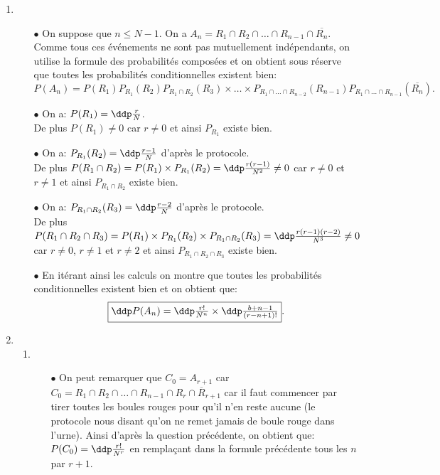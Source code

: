 \begin{correction}   \;
\begin{enumerate}
\item 
\begin{itemize}
\item[$\bullet$] On suppose que $n\leq N-1$. On a $A_n=R_1\cap R_2\cap \dots \cap R_{n-1}\cap \overline{R_n}$. Comme tous ces \'ev\'enements ne sont pas mutuellement ind\'ependants, on utilise la formule des probabilit\'es compos\'ees et on obtient sous r\'eserve que toutes les probabilit\'es conditionnelles existent bien:
$$P(A_n)=P(R_1)P_{R_1}(R_2)P_{R_1\cap R_2}(R_3)\times \dots \times P_{ R_1\cap \dots \cap R_{n-2}}(R_{n-1})P_{R_1\cap \dots \cap R_{n-1}}(\overline{R_n}).$$
\item[$\bullet$] On a: $P(R_1)=\ddp\frac{r}{N}$.\\
\noindent De plus $P(R_1)\not= 0$ car $r\not= 0$ et ainsi $P_{R_1}$ existe bien. 
\item[$\bullet$] On a: $P_{R_1}(R_2)=\ddp\frac{r-1}{N}$ d'apr\`{e}s le protocole.\\
\noindent De plus $P(R_1\cap R_2)=P(R_1)\times P_{R_1}(R_2)=\ddp\frac{r(r-1)}{N^2}\not= 0$ car $r\not= 0$ et $r\not= 1$ et ainsi $P_{R_1\cap R_2}$ existe bien.
\item[$\bullet$] On a: $P_{R_1\cap R_2}(R_3)=\ddp\frac{r-2}{N}$ d'apr\`{e}s le protocole.\\
\noindent De plus $P(R_1\cap R_2\cap R_3)=P(R_1)\times P_{R_1}(R_2)\times P_{R_1\cap R_2}(R_3)=\ddp\frac{r(r-1)(r-2)}{N^3}\not= 0$ car $r\not= 0$, $r\not= 1$ et $r\not= 2$ et ainsi $P_{R_1\cap R_2\cap R_3}$ existe bien. 
\item[$\bullet$]  En it\'erant ainsi les calculs on montre que toutes les probabilit\'es conditionnelles existent bien et on obtient que: $$\fbox{$\ddp P(A_n)=\ddp\frac{r!}{N^n}\times\ddp\frac{b+n-1}{(r-n+1)!}$}.$$
\end{itemize}
\item
\begin{enumerate}
\item 
\begin{itemize}
\item[$\bullet$] On peut remarquer que $C_0=A_{r+1}$ car $C_0=R_1\cap R_2\cap \dots \cap R_{n-1}\cap R_r \cap\overline{R}_{r+1}$ car il faut commencer par tirer toutes les boules rouges pour qu'il n'en reste aucune (le protocole nous disant qu'on ne remet jamais de boule rouge dans l'urne). Ainsi d'apr\`{e}s la question pr\'ec\'edente, on obtient que: $P(C_0)=\ddp\frac{r!}{N^r}$ en rempla\c{c}ant dans la formule pr\'ec\'edente tous les $n$ par $r+1$.

\end{itemize}
\end{enumerate}
\end{enumerate}
\end{correction}
